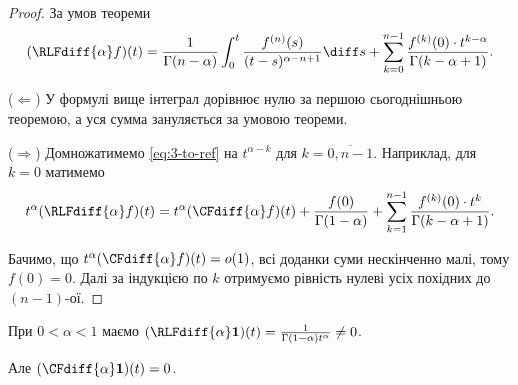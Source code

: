 \begin{proof}
    За умов теореми
    \begin{equation}
        \label{eq:3-to-ref}
        (\RLFdiff{\alpha} f)(t) = \frac{1}{\Gamma(n - \alpha)} \int_0^t \frac{f^{(n)}(s)}{(t - s)^{\alpha - n + 1}} \diff s + \sum_{k = 0}^{n - 1} \frac{f^{(k)}(0) \cdot t^{k - \alpha}}{\Gamma(k - \alpha + 1)}.
    \end{equation}

    ($\Longleftarrow$) У формулі вище інтеграл дорівнює нулю за першою сьогоднішньою теоремою, а уся сумма зануляється за умовою теореми. \medskip

    ($\Longrightarrow$) Домножатимемо \eqref{eq:3-to-ref} на $t^{\alpha - k}$ для $k = \overline{0, n - 1}$. Наприклад, для $k = 0$ матимемо
    \begin{equation}
        t^\alpha (\RLFdiff{\alpha} f)(t) = t^\alpha (\CFdiff{\alpha} f)(t) + \frac{f(0)}{\Gamma(1 - \alpha)} + \sum_{k = 1}^{n - 1} \frac{f^{(k)}(0) \cdot t^k}{\Gamma(k - \alpha + 1)}.
    \end{equation}

    Бачимо, що $t^\alpha (\CFdiff{\alpha} f)(t) = o(1)$, всі доданки суми нескінченно малі, тому $f(0) = 0$. Далі за індукцією по $k$ отримуємо рівність нулеві усіх похідних до $(n - 1)$-ої.
\end{proof}

\begin{remark}
    При $0 < \alpha < 1$ маємо $(\RLFdiff{\alpha} \textbf{1})(t) = \frac{1}{\Gamma(1 - \alpha) t^\alpha} \ne 0$.
\end{remark}

\begin{remark}
    Але $(\CFdiff{\alpha} \textbf{1})(t) = 0$.
\end{remark}

